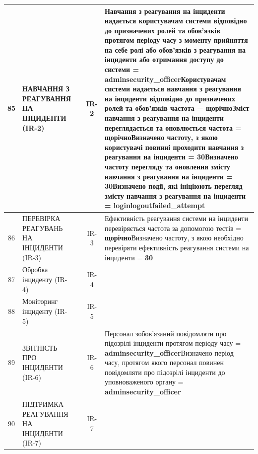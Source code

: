 \documentclass[10pt]{article}
\begin{document}
\begin{longtable}{|c|>{\raggedright\arraybackslash}p{2.5cm}|>{\raggedright\arraybackslash}p{4.5cm}|c|>{\raggedright\arraybackslash}p{4.5cm}|}
85 & НАВЧАННЯ З РЕАГУВАННЯ НА ІНЦИДЕНТИ (IR-2) &  & IR-2 & Навчання з реагування на інциденти надається користувачам системи відповідно до призначених ролей та обов'язків протягом періоду часу з моменту прийняття на себе ролі або обов'язків з реагування на інциденти або отримання доступу до системи = \textbf{adminsecurity\_\allowbreak{}officer}\newline Користувачам системи надається навчання з реагування на інциденти відповідно до призначених ролей та обов'язків частота = \textbf{щорічно}\newline Зміст навчання з реагування на інциденти переглядається та оновлюється частота = \textbf{щорічно}\newline Визначено частоту, з якою користувачі повинні проходити навчання з реагування на інциденти = \textbf{30}\newline Визначено частоту перегляду та оновлення змісту навчання з реагування на інциденти = \textbf{30}\newline Визначено події, які ініціюють перегляд змісту навчання з реагування на інциденти = \textbf{loginlogoutfailed\_\allowbreak{}attempt} \\ \hline
86 & ПЕРЕВІРКА РЕАГУВАНЬ НА ІНЦИДЕНТИ (IR-3) &  & IR-3 & Ефективність реагування системи на інциденти перевіряється частота за допомогою тестів = \textbf{щорічно}\newline Визначено частоту, з якою необхідно перевіряти ефективність реагування системи на інциденти = \textbf{30} \\ \hline
87 & Обробка інциденту (IR-4) &  & IR-4 &  \\ \hline
88 & Моніторинг інциденту (IR-5) &  & IR-5 &  \\ \hline
89 & ЗВІТНІСТЬ ПРО ІНЦИДЕНТИ (IR-6) &  & IR-6 & Персонал зобов'язаний повідомляти про підозрілі інциденти протягом періоду часу = \textbf{adminsecurity\_\allowbreak{}officer}\newline Визначено період часу, протягом якого персонал повинен повідомляти про підозрілі інциденти до уповноваженого органу = \textbf{adminsecurity\_\allowbreak{}officer} \\ \hline
90 & ПІДТРИМКА РЕАГУВАННЯ НА ІНЦИДЕНТИ (IR-7) &  & IR-7 &  \\ \hline

\end{longtable}
\end{document}
